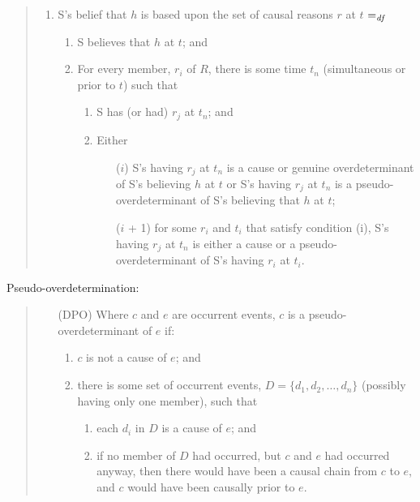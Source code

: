 \begin{note}
  \begin{quote}
    \begin{enumerate}[label=(DB)]
    \item
      S's belief that \(h\) is based upon the set of causal reasons \(r\) at \(t\) \(=_{\text{\emph{df}}}\)
      \begin{enumerate}[label=(\arabic*)]
      \item
        S believes that \(h\) at \(t\); and
      \item
        For every member, \(r_{i}\) of \(R\), there is some time \(t_{n}\) (simultaneous or prior to \(t\)) such that
        \begin{enumerate}[label=(\alph*)]
        \item
          S has (or had) \(r_{j}\) at \(t_{n}\); and
        \item
          Either
          \begin{enumerate}
          \item[(\(i\))]
            S's having \(r_{j}\) at \(t_{n}\) is a cause or genuine overdeterminant of S's believing \(h\) at \(t\) or S's having \(r_{j}\) at \(t_{n}\) is a pseudo-overdeterminant of S's believing that \(h\) at \(t\);
          \item[(\(i\) + 1)]
            for some \(r_{i}\) and \(t_{i}\) that satisfy condition (i), S's having \(r_{j}\) at \(t_{n}\) is either a cause or a pseudo-overdeterminant of S's having \(r_{i}\) at \(t_{i}\).
          \end{enumerate}
        \end{enumerate}
      \end{enumerate}
    \end{enumerate}
  \end{quote}

  Pseudo-overdetermination:

  \begin{quote}
    \begin{enumerate}
    \item[(DPO)]
      Where \(c\) and \(e\) are occurrent events, \(c\) is a pseudo-overdeterminant of \(e\) if:
      \begin{enumerate}[label=(\arabic*)]
      \item
        \(c\) is not a cause of \(e\); and
      \item
        there is some set of occurrent events, \(D = \{d_{1}, d_{2},\dots, d_{n}\}\) (possibly having only one member), such that
        \begin{enumerate}
        \item
          each \(d_{i}\) in \(D\) is a cause of \(e\); and
        \item
          if no member of \(D\) had occurred, but \(c\) and \(e\) had occurred anyway, then there would have been a causal chain from \(c\) to \(e\), and \(c\) would have been causally prior to \(e\).
        \end{enumerate}
      \end{enumerate}
    \end{enumerate}
  \end{quote}


\end{note}
